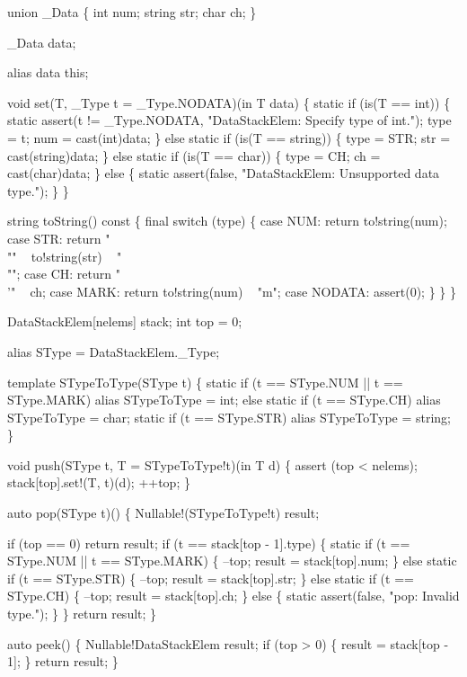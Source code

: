     union _Data \{
      int num;
      string str;
      char ch;
    \}

    _Data data;
  
    alias data this;
    
    void set(T, _Type t = _Type.NODATA)(in T data) \{
      static if (is(T == int)) \{
        static assert(t != _Type.NODATA,
          "DataStackElem: Specify type of int.");
        type = t;
        num  = cast(int)data;
      \} else static if (is(T == string)) \{
        type = STR;
        str = cast(string)data;
      \} else static if (is(T == char)) \{
        type = CH;
        ch = cast(char)data;
      \} else \{
        static assert(false,
          "DataStackElem: Unsupported data type.");
      \}
    \}

    string toString() const \{
      final switch (type) \{
      case NUM:    return to!string(num);
      case STR:    return "\\"" ~ to!string(str) ~ "\\"";
      case CH:     return "\\'" ~ ch;
      case MARK:   return to!string(num) ~ "m";
      case NODATA: assert(0);
      \}
    \}
  \}

  DataStackElem[nelems] stack;
  int top = 0;

  alias SType = DataStackElem._Type;

  template STypeToType(SType t) \{
    static if (t == SType.NUM || t == SType.MARK)
      alias STypeToType = int;
    else static if (t == SType.CH)
      alias STypeToType = char;
    static if (t == SType.STR)
      alias STypeToType = string;
  \}

  void push(SType t, T = STypeToType!t)(in T d)
  \{
    assert (top < nelems);
    stack[top].set!(T, t)(d);
    ++top;
  \}

  auto pop(SType t)()
  \{
    Nullable!(STypeToType!t) result;

    if (top == 0) return result;
    if (t == stack[top - 1].type) \{
      static if (t == SType.NUM ||
                 t == SType.MARK) \{
        --top;
        result = stack[top].num;
      \} else static if (t == SType.STR) \{
        --top;
        result = stack[top].str;
      \} else static if (t == SType.CH) \{
        --top;
        result = stack[top].ch;
      \} else \{
        static assert(false, "pop: Invalid type.");
      \}
    \}
    return result;
  \}

  auto peek()
  \{
    Nullable!DataStackElem result;
    if (top > 0) \{
      result = stack[top - 1];
    \}
    return result;
  \}


